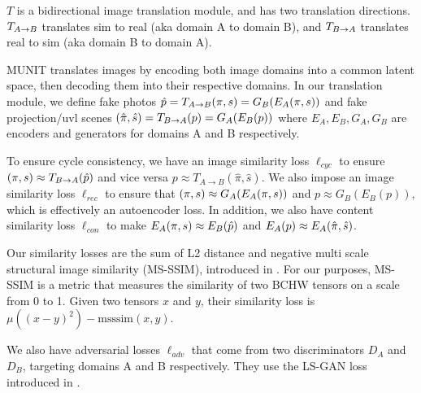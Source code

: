 \documentclass{article}
\begin{document}
$T$ is a bidirectional image translation module, and has two translation directions. $T_{A\rightarrow B}$ translates sim to real (aka domain A to domain B), and $T_{B\rightarrow A}$ translates real to sim (aka domain B to domain A).

MUNIT translates images by encoding both image domains into a common latent space, then decoding them into their respective domains.
In our translation module, we define fake photos $\hat{p} = T_{A\rightarrow B}(\pi,s) = G_B(E_A(\pi,s))$ and fake projection/uvl scenes $(\hat{\pi},\hat{s}) = T_{B\rightarrow A}(p) = G_A(E_B(p))$
	where $E_A, E_B, G_A, G_B$ are encoders and generators for domains A and B respectively.


To ensure cycle consistency, we have an image similarity loss $\ell_{cyc}$ to ensure
$(\pi,s) \approx T_{B\rightarrow A}(\hat{p})$
and vice versa
$p \approx T_{A\rightarrow B}(\hat{\pi},\hat{s})$.
We also impose an image similarity loss $\ell_{rec}$ to ensure that $(\pi,s) \approx G_A(E_A(\pi,s))$ and $p \approx G_B(E_B(p))$, which is effectively an autoencoder loss. 
In addition, we also have content similarity loss $ \ell_{con}$ to make 
$E_A(\pi,s) \approx E_B(\hat{p})$ and $E_A(p) \approx E_A(\hat{\pi},\hat{s})$.

Our similarity losses are the sum of L2 distance and negative multi scale structural image similarity (MS-SSIM), introduced in \citep{msssim}. For our purposes, MS-SSIM is a metric that measures the similarity of two BCHW tensors on a scale from 0 to 1. Given two tensors $x$ and $y$, their similarity loss is $\mu\left((x-y)^2\right) - \text{msssim}(x,y)$. 

We also have adversarial losses $\ell_{adv}$ that come from two discriminators $D_A$ and $D_B$, targeting domains A and B respectively. They use the LS-GAN loss introduced in \citep{lsgan}.
\end{document}

